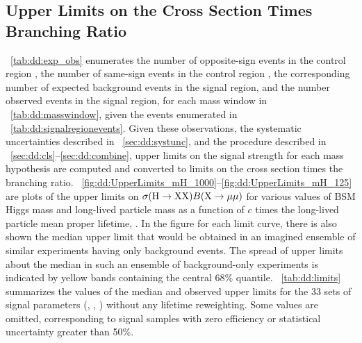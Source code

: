 \subsection{Upper Limits on the Cross Section Times Branching Ratio}
\label{sec:dd:limits}
\Tab~\ref{tab:dd:exp_obs} enumerates the number of opposite-sign events in the control region , the number of same-sign events in the control region , the corresponding number of expected background events in the signal region, and the number observed events in the signal region, for each mass window in \Tab~\ref{tab:dd:masswindow}, given the events enumerated in \Tab~\ref{tab:dd:signalregionevents}.
Given these observations, the systematic uncertainties described in \Sec~\ref{sec:dd:systunc}, and the procedure described in \Secs~\ref{sec:dd:cls}--\ref{sec:dd:combine}, upper limits on the signal strength for each mass hypothesis are computed and converted to limits on the cross section times the branching ratio.
\Figs~\ref{fig:dd:UpperLimits_mH_1000}--\ref{fig:dd:UpperLimits_mH_125} are plots of the upper limits on $\sigma(\mathrm{H}\to \mathrm{X}\mathrm{X})B(\mathrm{X}\to\mathrm{\mu}\mathrm{\mu})$ for various values of BSM Higgs mass \mH and long-lived particle mass \mX as a function of $c$ times the long-lived particle mean proper lifetime, \cTau.
In the figure for each limit curve, there is also shown the median upper limit that would be obtained in an imagined ensemble of similar experiments having only background events.
The spread of upper limits about the median in such an ensemble of background-only experiments is indicated by yellow bands containing the central 68\% quantile.
\Tab~\ref{tab:dd:limits} summarizes the values of the median and observed upper limits for the 33 sets of signal parameters (\mH, \mX, \cTau) without any lifetime reweighting.
Some values are omitted, corresponding to signal samples with zero efficiency or statistical uncertainty greater than 50\%.

